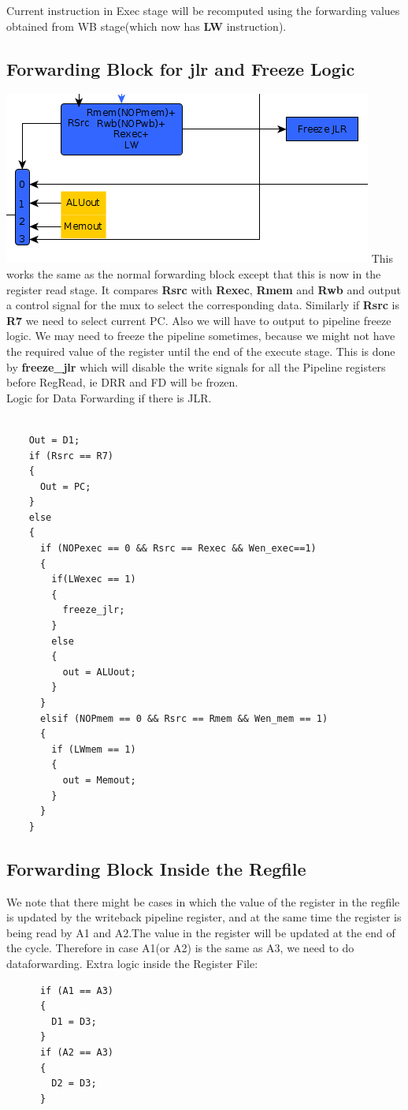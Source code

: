 \documentclass{article}
\begin{document}
Current instruction in Exec stage will be recomputed using the forwarding values
obtained from WB stage(which now has \textbf{LW} instruction).
\subsection*{Forwarding Block for jlr and Freeze Logic}

\includegraphics[scale=1]{jlr_freeze_logic}
This works the same as the normal forwarding block except that this is now in the register read stage. It compares
\textbf{Rsrc} with \textbf{Rexec}, \textbf{Rmem} and \textbf{Rwb} and output a control signal for the mux to select
the corresponding data. Similarly if \textbf{Rsrc} is \textbf{R7} we need to select current PC. Also we will have
to output to pipeline freeze logic. We may need to freeze the pipeline sometimes, because we might not have the
required value of the register until the end of the execute stage. This is done by \textbf{freeze\_jlr} which will
disable the write signals for all the Pipeline registers before RegRead, ie DRR and FD will be frozen.
\\ Logic for Data Forwarding if there is JLR.
\begin{lstlisting}

    Out = D1;
    if (Rsrc == R7)
    {
      Out = PC;
    }
    else
    {
      if (NOPexec == 0 && Rsrc == Rexec && Wen_exec==1)
      {
        if(LWexec == 1)
        {
          freeze_jlr;
        }
        else
        {
          out = ALUout;
        }
      }
      elsif (NOPmem == 0 && Rsrc == Rmem && Wen_mem == 1)
      {
        if (LWmem == 1)
        {
          out = Memout;
        }
      }
    }
    \end{lstlisting}

\subsection*{Forwarding Block Inside the Regfile}
We note that there might be cases in which the value of the register in the regfile is updated
by the writeback pipeline register, and at the same time the register is being read by A1 and A2.The
value in the register will be updated at the end of the cycle. Therefore in case A1(or A2) is the
same as A3, we need to do dataforwarding.
Extra logic inside the Register File:
    \begin{lstlisting}
      if (A1 == A3)
      {
        D1 = D3;
      }
      if (A2 == A3)
      {
        D2 = D3;
      }
    \end{lstlisting}
\end{document}
